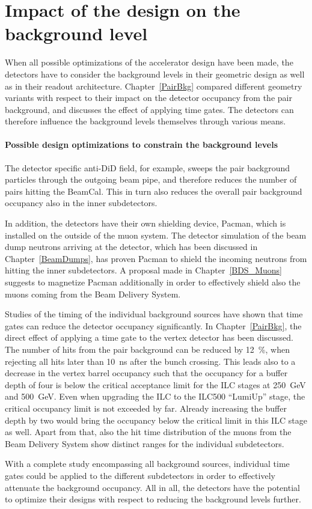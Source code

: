 \section{Impact of the \sid design on the background level}

When all possible optimizations of the accelerator design have been made, the detectors have to consider the background levels in their geometric design as well as in their readout architecture.
Chapter~\ref{PairBkg} compared different \sid geometry variants with respect to their impact on the detector occupancy from the pair background, and discusses the effect of applying time gates.
The detectors can therefore influence the background levels themselves through various means.

\paragraph{Possible \sid design optimizations to constrain the background levels}

The detector specific anti-DiD field, for example, sweeps the pair background particles through the outgoing beam pipe, and therefore reduces the number of pairs hitting the \sid BeamCal.
This in turn also reduces the overall pair background occupancy also in the inner subdetectors.

In addition, the detectors have their own shielding device, Pacman, which is installed on the outside of the muon system.
The detector simulation of the beam dump neutrons arriving at the \sid detector, which has been discussed in Chapter~\ref{BeamDumps}, has proven Pacman to shield the incoming neutrons from hitting the inner subdetectors.
A proposal made in Chapter~\ref{BDS_Muons} suggests to magnetize Pacman additionally in order to effectively shield also the muons coming from the Beam Delivery System.

Studies of the timing of the individual background sources have shown that time gates can reduce the detector occupancy significantly.
In Chapter~\ref{PairBkg}, the direct effect of applying a time gate to the \sid vertex detector has been discussed.
The number of hits from the pair background can be reduced by \SI{12}{\percent}, when rejecting all hits later than \SI{10}{\nano\second} after the bunch crossing.
This leads also to a decrease in the vertex barrel occupancy such that the occupancy for a buffer depth of four is below the critical acceptance limit for the ILC stages at \SI{250}{\GeV} and \SI{500}{\GeV}. 
Even when upgrading the ILC to the ILC500 ``LumiUp'' stage, the critical occupancy limit is not exceeded by far.
Already increasing the buffer depth by two would bring the occupancy below the critical limit in this ILC stage as well.
Apart from that, also the hit time distribution of the muons from the Beam Delivery System show distinct ranges for the individual \sid subdetectors.

With a complete study encompassing all background sources, individual time gates could be applied to the different \sid subdetectors in order to effectively attenuate the background occupancy.
All in all, the detectors have the potential to optimize their designs with respect to reducing the background levels further.